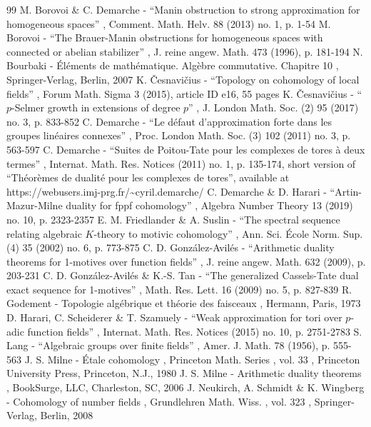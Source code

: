 \documentclass[10pt,a4paper]{amsart}
\theoremstyle{plain}
\theoremstyle{definition}
\begin{document}
\begin{thebibliography}{99}
 M. Borovoi \& C. Demarche - “Manin obstruction to strong approximation for homogeneous spaces” , Comment. Math. Helv. 88 (2013) no. 1, p. 1-54
 M. Borovoi - “The Brauer-Manin obstructions for homogeneous spaces with connected or abelian stabilizer” , J. reine angew. Math. 473 (1996), p. 181-194
 N. Bourbaki - Éléments de mathématique. Algèbre commutative. Chapitre 10 , Springer-Verlag, Berlin, 2007
 K. Česnavičius - “Topology on cohomology of local fields” , Forum Math. Sigma 3 (2015), article ID e16, 55 pages
 K. Česnavičius - “$p$-Selmer growth in extensions of degree $p$” , J. London Math. Soc. (2) 95 (2017) no. 3, p. 833-852
 C. Demarche - “Le défaut d’approximation forte dans les groupes linéaires connexes” , Proc. London Math. Soc. (3) 102 (2011) no. 3, p. 563-597
 C. Demarche - “Suites de Poitou-Tate pour les complexes de tores à deux termes” , Internat. Math. Res. Notices (2011) no. 1, p. 135-174, short version of “Théorèmes de dualité pour les complexes de tores”, available at https://webusers.imj-prg.fr/\textasciitilde{}cyril.demarche/
 C. Demarche \& D. Harari - “Artin-Mazur-Milne duality for fppf cohomology” , Algebra Number Theory 13 (2019) no. 10, p. 2323-2357
 E. M. Friedlander \& A. Suslin - “The spectral sequence relating algebraic $K$-theory to motivic cohomology” , Ann. Sci. École Norm. Sup. (4) 35 (2002) no. 6, p. 773-875
 C. D. González-Avilés - “Arithmetic duality theorems for 1-motives over function fields” , J. reine angew. Math. 632 (2009), p. 203-231
 C. D. González-Avilés \& K.-S. Tan - “The generalized Cassels-Tate dual exact sequence for 1-motives” , Math. Res. Lett. 16 (2009) no. 5, p. 827-839
 R. Godement - Topologie algébrique et théorie des faisceaux , Hermann, Paris, 1973
 D. Harari, C. Scheiderer \& T. Szamuely - “Weak approximation for tori over $p$-adic function fields” , Internat. Math. Res. Notices (2015) no. 10, p. 2751-2783
 S. Lang - “Algebraic groups over finite fields” , Amer. J. Math. 78 (1956), p. 555-563
 J. S. Milne - Étale cohomology , Princeton Math. Series , vol. 33 , Princeton University Press, Princeton, N.J., 1980
 J. S. Milne - Arithmetic duality theorems , BookSurge, LLC, Charleston, SC, 2006
 J. Neukirch, A. Schmidt \& K. Wingberg - Cohomology of number fields , Grundlehren Math. Wiss. , vol. 323 , Springer-Verlag, Berlin, 2008

\end{thebibliography}
\end{document}
